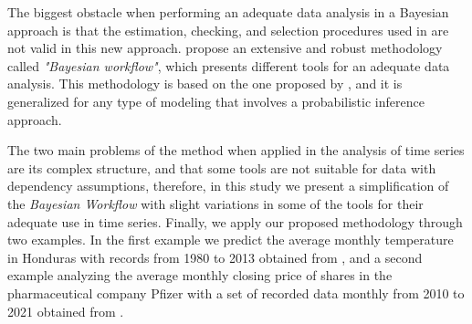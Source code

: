 The biggest obstacle when performing an adequate data analysis in a Bayesian approach is that the estimation, checking, and selection procedures used in \citet{boxjen} are not valid in this new approach. propose an extensive and robust methodology called \textit{"Bayesian workflow"}, which presents different tools for an adequate data analysis. This methodology is based on the one proposed by \citet{boxjen}, and it is generalized for any type of modeling that involves a probabilistic inference approach.

The two main problems of the \citet{Aki} method when applied in the analysis of time series are its complex structure, and that some tools are not suitable for data with dependency assumptions, therefore, in this study we present a simplification of the \textit{Bayesian Workflow} with slight variations in some of the tools for their adequate use in time series. Finally, we apply our proposed methodology through two examples. In the first example we predict the average monthly temperature in Honduras with records from 1980 to 2013 obtained from \citet{berkeley}, and a second example analyzing the average monthly closing price of shares in the pharmaceutical company Pfizer with a set of recorded data monthly from 2010 to 2021 obtained from \citet{kaggle}.
%	
